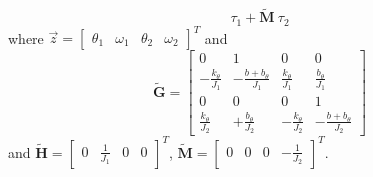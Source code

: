 \documentclass[12pt,a4paper,oneside]{book}
\begin{document}
\begin{onehalfspace}
\begin{equation}
	\tau_1+\tilde{\mathbf{M}} \ \tau_2
\end{equation}
where $\vec{z}=\left[ \begin{matrix}
	\theta_1&\omega_1&\theta_2&\omega_2
\end{matrix}\right]^T$
and 
\begin{equation}
	\tilde{\mathbf{G}} = 
	\left[ \begin{matrix}
		0&1&0&0\\[6pt]
		-\frac{k_{\theta}}{J_1}&-\frac{b+b_{\theta}}{J_1}&\frac{k_{\theta}}{J_1}&\frac{b_{\theta}}{J_1}\\[6pt]
		0&0&0&1\\[6pt]
		\frac{k_{\theta}}{J_2}&+\frac{b_{\theta}}{J_2}&-\frac{k_{\theta}}{J_2}&-\frac{b+b_{\theta}}{J_2}
	\end{matrix}\right]
\end{equation}
and $\tilde{\mathbf{H}} =\left[ \begin{matrix}
	0&\frac{1}{J_1}&0&0
\end{matrix}\right]^T$, 
$\tilde{\mathbf{M}} =\left[ \begin{matrix}
	0&0&0&-\frac{1}{J_2}
\end{matrix}\right]^T$.


\end{onehalfspace}
\end{document}
